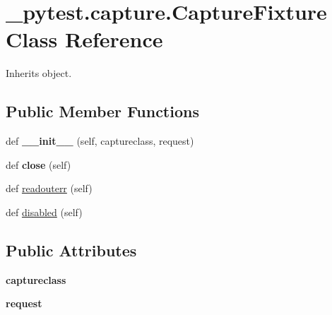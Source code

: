 \hypertarget{class__pytest_1_1capture_1_1_capture_fixture}{}\section{\+\_\+pytest.\+capture.\+Capture\+Fixture Class Reference}
\label{class__pytest_1_1capture_1_1_capture_fixture}


Inherits object.

\subsection*{Public Member Functions}
\begin{DoxyCompactItemize}
\item 
\mbox{\label{class__pytest_1_1capture_1_1_capture_fixture_a68f063f014e670fab1511a5da0eb82ed}} 
def {\bfseries \+\_\+\+\_\+init\+\_\+\+\_\+} (self, captureclass, request)
\item 
\mbox{\label{class__pytest_1_1capture_1_1_capture_fixture_acfe7f707b4045fdcecfa751addd45948}} 
def {\bfseries close} (self)
\item 
def \hyperlink{class__pytest_1_1capture_1_1_capture_fixture_a1067f56196649f375e080bf9f65d3a33}{readouterr} (self)
\item 
def \hyperlink{class__pytest_1_1capture_1_1_capture_fixture_abd27f778592b89220819fb1dbf93fa61}{disabled} (self)
\end{DoxyCompactItemize}
\subsection*{Public Attributes}
\begin{DoxyCompactItemize}
\item 
\mbox{\label{class__pytest_1_1capture_1_1_capture_fixture_ae23f7033254e8168fcc4ae86ee2e897b}} 
{\bfseries captureclass}
\item 
\mbox{\label{class__pytest_1_1capture_1_1_capture_fixture_adfcaf66fb993d7b6f9eadc9bf7dbebad}} 
{\bfseries request}
\end{DoxyCompactItemize}


